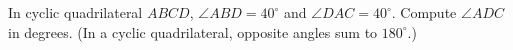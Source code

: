 In cyclic quadrilateral $ABCD$, $\angle ABD=40^\circ$ and $\angle DAC=40^\circ$. Compute $\angle ADC$ in degrees. (In a cyclic quadrilateral, opposite angles sum to $180^\circ$.)
